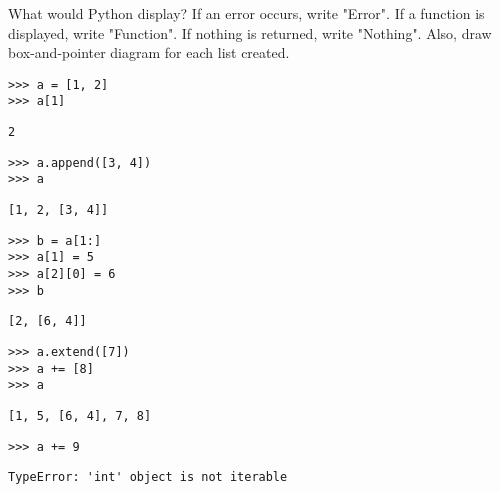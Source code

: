 \begin{blocksection}
\question What would Python display? If an error occurs, write "Error". If a function is displayed, write "Function". If nothing is returned, write "Nothing". Also, draw box-and-pointer diagram for each list created.

\begin{lstlisting}
>>> a = [1, 2]
>>> a[1]
\end{lstlisting}
\begin{solution}[0.25in]
\begin{lstlisting}
2
\end{lstlisting}
\end{solution}
\begin{lstlisting}
>>> a.append([3, 4])
>>> a
\end{lstlisting}
\begin{solution}[0.25in]
\begin{lstlisting}
[1, 2, [3, 4]]
\end{lstlisting}
\end{solution}
\end{blocksection}

\begin{lstlisting}
>>> b = a[1:]
>>> a[1] = 5
>>> a[2][0] = 6
>>> b
\end{lstlisting}
\begin{solution}[0.25in]
\begin{lstlisting}
[2, [6, 4]]
\end{lstlisting}
\end{solution}

\begin{lstlisting}
>>> a.extend([7])
>>> a += [8]
>>> a
\end{lstlisting}

\begin{solution}[0.25in]
\begin{lstlisting}
[1, 5, [6, 4], 7, 8]
\end{lstlisting}
\end{solution}

\begin{lstlisting}
>>> a += 9
\end{lstlisting}
\begin{solution}[0.25in]
\begin{lstlisting}
TypeError: 'int' object is not iterable
\end{lstlisting}
\end{solution}

